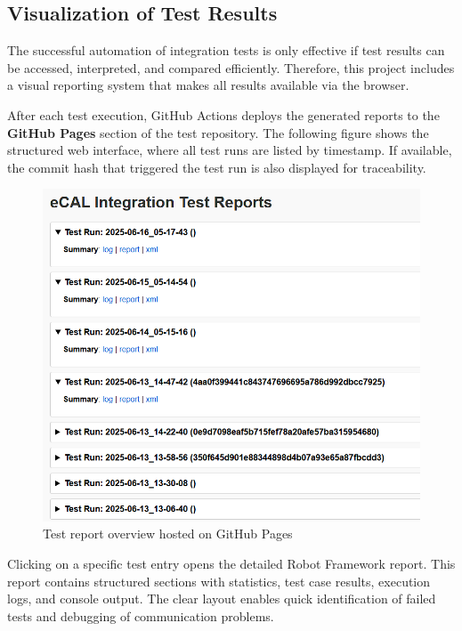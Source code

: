 \clearpage
\subsection{Visualization of Test Results}

The successful automation of integration tests is only effective if test results can be accessed, interpreted, and compared efficiently. Therefore, this project includes a visual reporting system that makes all results available via the browser.

\vspace{0.9em}
After each test execution, GitHub Actions deploys the generated reports to the \textbf{GitHub Pages} section of the test repository. The following figure shows the structured web interface, where all test runs are listed by timestamp. If available, the commit hash that triggered the test run is also displayed for traceability.

\begin{figure}[H]
	\centering
	\includegraphics[width=\textwidth]{Images/github_pages_overview.png}
	\caption{Test report overview hosted on GitHub Pages}
	\label{fig:gh_pages_overview}
\end{figure}

\vspace{0.5em}
Clicking on a specific test entry opens the detailed Robot Framework report. This report contains structured sections with statistics, test case results, execution logs, and console output. The clear layout enables quick identification of failed tests and debugging of communication problems.

